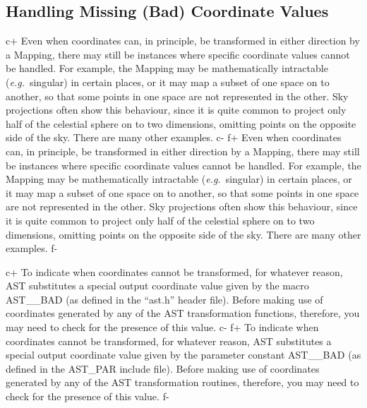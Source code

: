 \documentclass[twoside,11pt]{article}
\begin{document}

\subsection{\label{ss:badcoordinates}Handling Missing (Bad) Coordinate Values}

c+
Even when coordinates can, in principle, be transformed in either
direction by a Mapping, there may still be instances where specific
coordinate values cannot be handled. For example, the Mapping may be
mathematically intractable ({\em{e.g.}}\ singular) in certain places,
or it may map a subset of one space on to another, so that some points
in one space are not represented in the other.  Sky projections often
show this behaviour, since it is quite common to project only half of
the celestial sphere on to two dimensions, omitting points on the
opposite side of the sky. There are many other examples.
c-
f+
Even when coordinates can, in principle, be transformed in either
direction by a Mapping, there may still be instances where specific
coordinate values cannot be handled. For example, the Mapping may be
mathematically intractable ({\em{e.g.}}\ singular) in certain places,
or it may map a subset of one space on to another, so that some points
in one space are not represented in the other.  Sky projections often
show this behaviour, since it is quite common to project only half of
the celestial sphere on to two dimensions, omitting points on the
opposite side of the sky. There are many other examples.
f-

c+
To indicate when coordinates cannot be transformed, for whatever
reason, AST substitutes a special output coordinate value given by the
macro AST\_\_BAD (as defined in the ``ast.h'' header file).  Before
making use of coordinates generated by any of the AST transformation
functions, therefore, you may need to check for the presence of this
value.
c-
f+
To indicate when coordinates cannot be transformed, for whatever
reason, AST substitutes a special output coordinate value given by the
parameter constant AST\_\_BAD (as defined in the AST\_PAR include
file).  Before making use of coordinates generated by any of the AST
transformation routines, therefore, you may need to check for the
presence of this value.
f-
\end{document}
